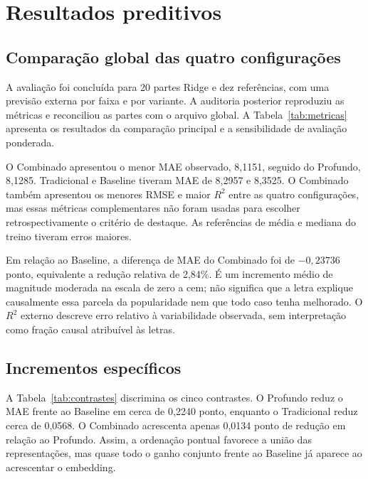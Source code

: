 \chapter{Resultados preditivos}\label{cap:resultados}
\section{Comparação global das quatro configurações}
A avaliação foi concluída para 20 partes Ridge e dez referências, com uma previsão externa por faixa e por variante. A auditoria posterior reproduziu as métricas e reconciliou as partes com o arquivo global. A Tabela~\ref{tab:metricas} apresenta os resultados da comparação principal e a sensibilidade de avaliação ponderada.



O Combinado apresentou o menor MAE observado, 8,1151, seguido do Profundo, 8,1285. Tradicional e Baseline tiveram MAE de 8,2957 e 8,3525. O Combinado também apresentou os menores RMSE e maior $R^2$ entre as quatro configurações, mas essas métricas complementares não foram usadas para escolher retrospectivamente o critério de destaque. As referências de média e mediana do treino tiveram erros maiores.

Em relação ao Baseline, a diferença de MAE do Combinado foi de $-0{,}23736$ ponto, equivalente a redução relativa de 2,84\%. É um incremento médio de magnitude moderada na escala de zero a cem; não significa que a letra explique causalmente essa parcela da popularidade nem que todo caso tenha melhorado. O $R^2$ externo descreve erro relativo à variabilidade observada, sem interpretação como fração causal atribuível às letras.

\FloatBarrier

\section{Incrementos específicos}
A Tabela~\ref{tab:contrastes} discrimina os cinco contrastes. O Profundo reduz o MAE frente ao Baseline em cerca de 0,2240 ponto, enquanto o Tradicional reduz cerca de 0,0568. O Combinado acrescenta apenas 0,0134 ponto de redução em relação ao Profundo. Assim, a ordenação pontual favorece a união das representações, mas quase todo o ganho conjunto frente ao Baseline já aparece ao acrescentar o embedding.


